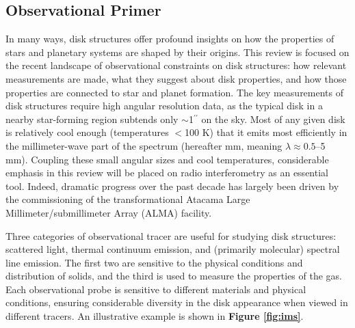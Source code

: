 \documentclass[a4paper]{ar-1col}
\begin{document}
\subsection{Observational Primer} \label{sec:primer}

In many ways, disk structures offer profound insights on how the properties of stars and planetary systems are shaped by their origins.  This review is focused on the recent landscape of observational constraints on disk structures: how relevant measurements are made, what they suggest about disk properties, and how those properties are connected to star and planet formation.  The key measurements of disk structures require high angular resolution data, as the typical disk in a nearby star-forming region subtends only $\sim$1$^{\prime\prime}$ on the sky.  Most of any given disk is relatively cool enough (temperatures $<$100 K) that it emits most efficiently in the millimeter-wave part of the spectrum (hereafter mm, meaning $\lambda \approx 0.5$--5 mm).  Coupling these small angular sizes and cool temperatures, considerable emphasis in this review will be placed on radio interferometry as an essential tool.  Indeed, dramatic progress over the past decade has largely been driven by the commissioning of the transformational Atacama Large Millimeter/submillimeter Array (ALMA) facility.
\begin{marginnote}[]
\end{marginnote}

Three categories of observational tracer are useful for studying disk structures: scattered light, thermal continuum emission, and (primarily molecular) spectral line emission.  The first two are sensitive to the physical conditions and distribution of solids, and the third is used to measure the properties of the gas.  Each observational probe is sensitive to different materials and physical conditions, ensuring considerable diversity in the disk appearance when viewed in different tracers.  An illustrative example is shown in {\bf Figure \ref{fig:ims}}. 
\end{document}
